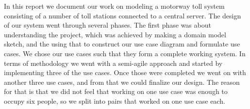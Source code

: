 
In this report we document our work on modeling a motorway toll system consisting of a number of toll stations connected to a central server. The design of our system went through several phases. The first phase was about understanding the project, which was achieved by making a domain model sketch, and the using that to construct our use case diagram and formulate use cases. We chose our use cases such that they form a complete working system. In terms of methodology we went with a semi-agile approach and started by implementing three of the use cases. Once those were completed we went on with another three use cases, and from that we could finalize our design. The reason for that is that we did not feel that working on one use case was enough to occupy six people, so we split into pairs that worked on one use case each.